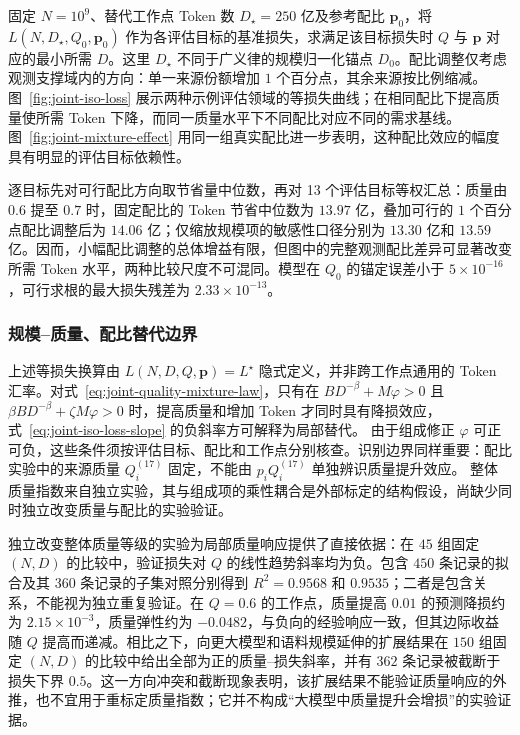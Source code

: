 \documentclass[bwprint]{gmcmthesis}
\begin{document}
固定 $N=10^9$、替代工作点 Token 数 $D_\star=250$ 亿及参考配比 $\mathbf p_0$，将 $L(N,D_\star,Q_0,\mathbf p_0)$ 作为各评估目标的基准损失，求满足该目标损失时 $Q$ 与 $\mathbf p$ 对应的最小所需 $D$。这里 $D_\star$ 不同于广义律的规模归一化锚点 $D_0$。配比调整仅考虑观测支撑域内的方向：单一来源份额增加 $1$ 个百分点，其余来源按比例缩减。图~\ref{fig:joint-iso-loss} 展示两种示例评估领域的等损失曲线；在相同配比下提高质量使所需 Token 下降，而同一质量水平下不同配比对应不同的需求基线。图~\ref{fig:joint-mixture-effect} 用同一组真实配比进一步表明，这种配比效应的幅度具有明显的评估目标依赖性。

逐目标先对可行配比方向取节省量中位数，再对 13 个评估目标等权汇总：质量由 $0.6$ 提至 $0.7$ 时，固定配比的 Token 节省中位数为 $13.97$ 亿，叠加可行的 $1$ 个百分点配比调整后为 $14.06$ 亿；仅缩放规模项的敏感性口径分别为 $13.30$ 亿和 $13.59$ 亿。因而，小幅配比调整的总体增益有限，但图中的完整观测配比差异可显著改变所需 Token 水平，两种比较尺度不可混同。模型在 $Q_0$ 的锚定误差小于 $5\times10^{-16}$，可行求根的最大损失残差为 $2.33\times10^{-13}$。

\subsubsection{规模--质量、配比替代边界}

上述等损失换算由 $L(N,D,Q,\mathbf p)=L^\star$ 隐式定义，并非跨工作点通用的 Token 汇率。对式~\eqref{eq:joint-quality-mixture-law}，只有在 $BD^{-\beta}+M\varphi>0$ 且 $\beta BD^{-\beta}+\zeta M\varphi>0$ 时，提高质量和增加 Token 才同时具有降损效应，式~\eqref{eq:joint-iso-loss-slope} 的负斜率方可解释为局部替代。
由于组成修正 $\varphi$ 可正可负，这些条件须按评估目标、配比和工作点分别核查。识别边界同样重要：配比实验中的来源质量 $Q_i^{(17)}$ 固定，不能由 $p_iQ_i^{(17)}$ 单独辨识质量提升效应。
整体质量指数来自独立实验，其与组成项的乘性耦合是外部标定的结构假设，尚缺少同时独立改变质量与配比的实验验证。

独立改变整体质量等级的实验为局部质量响应提供了直接依据：在 $45$ 组固定 $(N,D)$ 的比较中，验证损失对 $Q$ 的线性趋势斜率均为负。包含 $450$ 条记录的拟合及其 $360$ 条记录的子集对照分别得到 $R^2=0.9568$ 和 $0.9535$；二者是包含关系，不能视为独立重复验证。在 $Q=0.6$ 的工作点，质量提高 $0.01$ 的预测降损约为 $2.15\times10^{-3}$，质量弹性约为 $-0.0482$，与负向的经验响应一致，但其边际收益随 $Q$ 提高而递减。相比之下，向更大模型和语料规模延伸的扩展结果在 $150$ 组固定 $(N,D)$ 的比较中给出全部为正的质量--损失斜率，并有 $362$ 条记录被截断于损失下界 $0.5$。这一方向冲突和截断现象表明，该扩展结果不能验证质量响应的外推，也不宜用于重标定质量指数；它并不构成“大模型中质量提升会增损”的实验证据。
\end{document}
